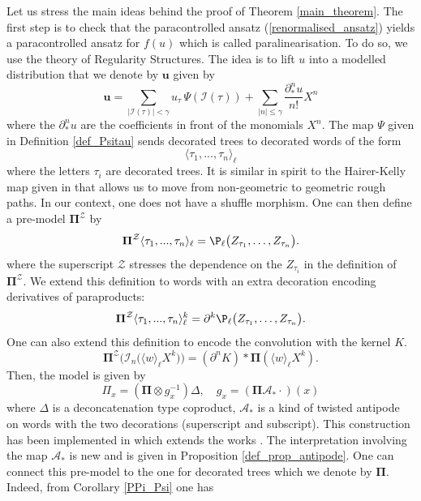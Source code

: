 \documentclass[11pt]{preprint}
\def\CA{\mathcal{A}}
\newcommand{\mcI}{\mathcal{I}}
\newcounter{theorem}
\def\PPi{\boldsymbol{\Pi}}
\def\eqref#1{(\ref{#1})}
\renewcommand{\lg}{\langle}
\newcommand{\rg}{\rangle}
\begin{document}
	Let us stress the main ideas behind the proof of Theorem \ref{main_theorem}. The first step is to check that the paracontrolled ansatz \eqref{renormalised_ansatz} yields a paracontrolled ansatz for $f(u)$ which is called paralinearisation.
To do so, we use the theory of Regularity Structures. The idea is to lift $u$ into a modelled distribution that we denote by $ \bm{u} $ given by
	\begin{equation}\bm{ u} = \sum_{|\mcI(\tau)|<\gamma } u_\tau \, \Psi(\mcI(\tau))  + \sum_{ |n|\leq \gamma } \frac{\partial_*^{n} u}{n!} X^{n}
		\end{equation}
		where the $\partial_*^{n} u$ are the coefficients in front of the monomials $X^n$. The map $\Psi$ given in Definition \ref{def_Psitau} sends decorated trees to decorated words of the form
		\begin{equation*}
			\langle \tau_1,..., \tau_n \rangle_{\ell}
		\end{equation*}
		where the letters $\tau_i$ are decorated trees. It is similar in spirit to the Hairer-Kelly map given in \cite[Lemma 4.9]{HK15} that allows us to move from non-geometric to geometric rough paths. In our context, one does not have a shuffle morphism.
		One can then define a pre-model $\PPi^{\mathcal{Z}} $ by
		\begin{equation*}
			\PPi^{\mathcal{Z}}	\langle \tau_1,..., \tau_n \rangle_{\ell} = \P_\ell\big(Z_{\tau_1},\dots,Z_{\tau_n}\big).
		\end{equation*}
		where the superscript $ \mathcal{Z} $ stresses the dependence on the $Z_{\tau_i}$ in the definition of $\PPi^{\mathcal{Z}}$.
		We extend this definition to words with an extra decoration encoding derivatives of paraproducts:
		\begin{equation*}
			\PPi^{\mathcal{Z}} 	\langle \tau_1,..., \tau_n \rangle_{\ell}^k = \partial^k \P_\ell\big(Z_{\tau_1},\dots,Z_{\tau_n}\big).
		\end{equation*}
		One can also extend this definition to encode the convolution with the kernel $K$. 
		$$
		{\PPi}^{\mathcal{Z}}\Big(\mcI_n \big( \lg w \rg_\ell X^k \big)\Big)= (\partial^n K) * {\PPi}\left(\lg w \rg_\ell X^k\right).
		$$
		Then, the model is given by
		\begin{equation*}
			\Pi_x = \left( \PPi \otimes g_x^{-1}  \right) \Delta, \quad g_x  = (\PPi \CA_{*} \cdot)(x)
		\end{equation*}
where $ \Delta $ is a deconcatenation type coproduct,  $\CA_{*}$ is a  kind of twisted antipode on words with the two decorations (superscript and subscript). This construction has been implemented in \cite{LocalExpansionsParacSystems} which extends the works \cite{Hos20, Hos21, Hos24}. The interpretation involving the map $\CA_{*}$ is new and is given in Proposition \ref{def_prop_antipode}. One can connect this pre-model to the one for decorated trees which we denote by $\PPi$. Indeed, from Corollary \ref{PPi_Psi} one has
\end{document}
